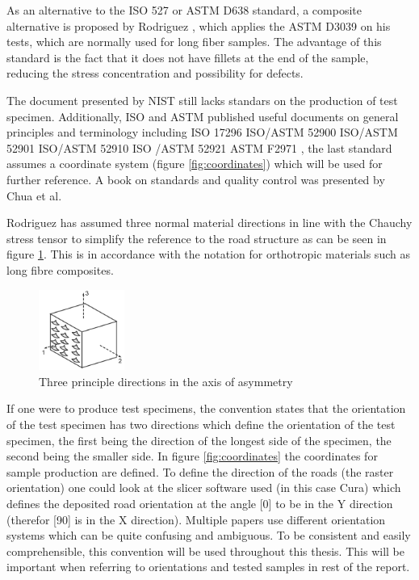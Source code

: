 As an alternative to the ISO 527 or ASTM D638 standard, a composite alternative is proposed by Rodriguez \cite{Rodriguez2001MechanicalInvestigation}, which applies the ASTM D3039 on his tests, which are normally used for long fiber samples. The advantage of this standard is the fact that it does not have fillets at the end of the sample, reducing the stress concentration and possibility for defects.

The document presented by NIST \cite{Forster2015NISTApplicability} still lacks standars on the production of test specimen. Additionally, ISO and ASTM published useful documents on general principles and terminology including ISO 17296  \cite{Afd2014NEN-EN-ISO179-1} ISO/ASTM 52900 \cite{ASTMInternational2017ISOParts} ISO/ASTM 52901 \cite{2019NEN-EN-ISOParts} ISO/ASTM 52910  \cite{ASTMInternational2017ISOParts} ISO /ASTM 52921 \cite{Nen-iso2019NEN-EN-ISOTestmethoden} ASTM F2971 \cite{2013ASTMManufacturing}, the last standard assumes a coordinate system (figure \ref{fig:coordinates}) which will be used for further reference. A book on standards and quality control was presented by Chua et al. \cite{ChuaStandardManufacturing}

Rodriguez \cite{Rodriguez2003MechanicalModeling} has assumed three normal material directions in line with the Chauchy stress tensor to simplify the reference to the road structure as can be seen in figure \ref{fig:Principlematerial}. This is in accordance with the notation for orthotropic materials such as long fibre composites.
\begin{figure}[H]
    \centering
    \includegraphics[width=0.25\textwidth]{chapter_2/figures/Principlematerial.PNG}
    \caption{Three principle directions in the axis of asymmetry}
    \label{fig:Principlematerial}
\end{figure}

If one were to produce test specimens, the convention states that the orientation of the test specimen has two directions which define the orientation of the test specimen, the first being the direction of the longest side of the specimen, the second being the smaller side. In figure \ref{fig:coordinates} the coordinates for sample production are defined. 
To define the direction of the roads (the raster orientation) one could look at the slicer software used (in this case Cura) which defines the deposited road orientation at the angle [0] to be in the Y direction (therefor [90] is in the X direction). Multiple papers use different orientation systems which can be quite confusing and ambiguous. To be consistent and easily comprehensible, this convention will be used throughout this thesis. This will be important when referring to orientations and tested samples in rest of the report. 


